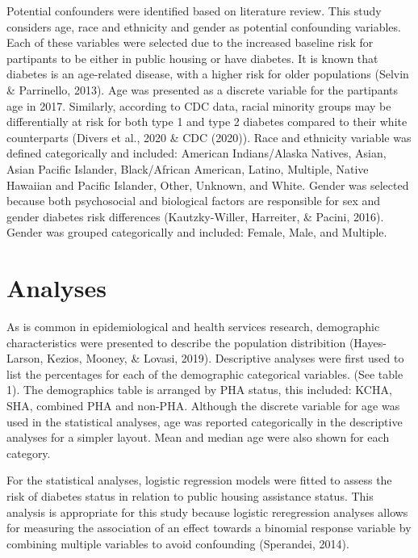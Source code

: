 \documentclass [11pt, proquest] {uwthesis}[2015/03/03]
\begin{document}
Potential confounders were identified based on literature review. This
study considers age, race and ethnicity and gender as potential
confounding variables. Each of these variables were selected due to the
increased baseline risk for partipants to be either in public housing or
have diabetes. It is known that diabetes is an age-related disease, with
a higher risk for older populations (Selvin \& Parrinello, 2013). Age
was presented as a discrete variable for the partipants age in 2017.
Similarly, according to CDC data, racial minority groups may be
differentially at risk for both type 1 and type 2 diabetes compared to
their white counterparts (Divers et al., 2020 \& CDC (2020)). Race and
ethnicity variable was defined categorically and included: American
Indians/Alaska Natives, Asian, Asian Pacific Islander, Black/African
American, Latino, Multiple, Native Hawaiian and Pacific Islander, Other,
Unknown, and White. Gender was selected because both psychosocial and
biological factors are responsible for sex and gender diabetes risk
differences (Kautzky-Willer, Harreiter, \& Pacini, 2016). Gender was
grouped categorically and included: Female, Male, and Multiple.

\section{Analyses}\label{analyses}

As is common in epidemiological and health services research,
demographic characteristics were presented to describe the population
distribition (Hayes-Larson, Kezios, Mooney, \& Lovasi, 2019).
Descriptive analyses were first used to list the percentages for each of
the demographic categorical variables. (See table 1). The demographics
table is arranged by PHA status, this included: KCHA, SHA, combined PHA
and non-PHA. Although the discrete variable for age was used in the
statistical analyses, age was reported categorically in the descriptive
analyses for a simpler layout. Mean and median age were also shown for
each category.

For the statistical analyses, logistic regression models were fitted to
assess the risk of diabetes status in relation to public housing
assistance status. This analysis is appropriate for this study because
logistic reregression analyses allows for measuring the association of
an effect towards a binomial response variable by combining multiple
variables to avoid confounding (Sperandei, 2014).
\end{document}
